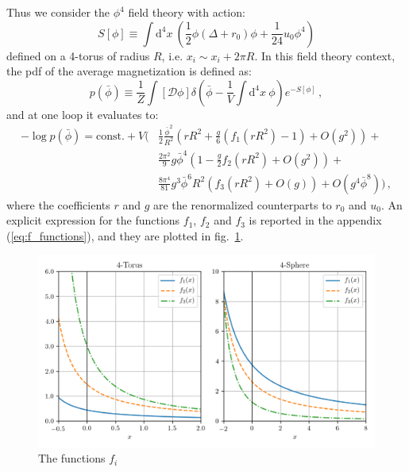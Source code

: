 \documentclass[11pt,a4paper]{article}
\newcommand{\dd}{\mathrm{d}}
\begin{document}
Thus we consider the $\phi^4$ field theory with action:
\begin{equation}
  S[\phi] \equiv \int \dd^4 x\ \left(
    \frac{1}{2} \phi\left(\Delta + r_0\right)\phi +
    \frac{1}{24} u_0 \phi^4\right)
\end{equation}
defined on a 4-torus of radius $R$, i.e. $x_i\sim x_i + 2\pi R$. In this field
theory context, the pdf of the average magnetization is defined as:
\begin{equation}
    \label{eq:pdf_definition}
    p(\bar\phi) \equiv \frac{1}{Z} \int \left[\mathcal{D}\phi\right]
    \delta\left(\bar{\phi} - \frac{1}{V}\int\dd^4 x\ \phi\right)
    e^{-S[\phi]}\,,
\end{equation}
and at one loop it evaluates to:
\begin{equation}
\label{eq:log_pdf}
\begin{split}
    -\log p(\bar{\phi}) = \mathrm{const.} +  V\Bigg(
  &\frac{1}{2} \frac{\bar{\phi}^2}{R^2} \left(
    r R^2 + \frac{g}{6} \left(f_1\left(r R^2\right) - 1\right)
    + O\left(g^2\right)\right) + \\
  & \frac{2\pi^2}{9}g\bar{\phi}^4\left(
    1 - \frac{g}{2}f_2\left(r R^2\right)
    + O\left(g^2\right)\right) + \\
  & \frac{8\pi^4}{81} g^3 \bar{\phi}^6 R^2\left(
    f_3\left(r R^2\right)
    + O\left(g\right)\right) + O\left(g^4\bar{\phi}^8\right) \Bigg)\,,
\end{split}
\end{equation}
where the coefficients $r$ and $g$ are the renormalized counterparts to $r_0$
and $u_0$. An explicit expression for the functions $f_1$, $f_2$ and $f_3$ is
reported in the appendix (\ref{eq:f_functions}), and they are plotted in
fig.~\ref{fig:f_functions}.

\begin{figure}
\begin{center}
\includegraphics[scale=0.75]{f_functions.png}
\end{center}
\caption{\label{fig:f_functions} The functions $f_i$}
\end{figure}
\end{document}
